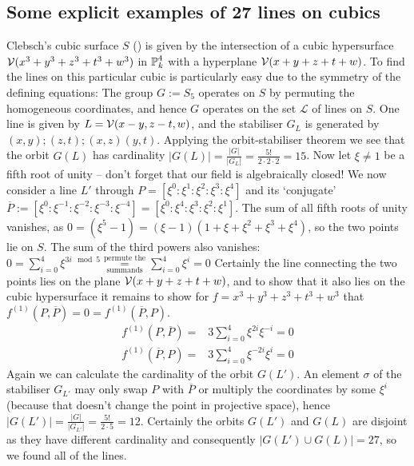 \subsection{Some explicit examples of 27 lines on cubics}


\begin{example}
Clebsch's cubic surface $S$ (\cite[§16,p.331 ff.]{clebsch1871ueber}) is given by the intersection of a cubic hypersurface $\operatorname{\mathcal V}(x^3 + y^3 + z^3 + t^3 + w^3)$ in $\operatorname{\mathbb P}^4_k$ with a hyperplane $\operatorname{\mathcal V}(x+y+z+t+w)$.
To find the lines on this particular cubic is particularly easy due to the symmetry of the defining equations: The group $G := S_5$ operates on $S$ by permuting the homogeneous coordinates, and hence $G$ operates on the set $\mathcal L$ of lines on $S$.
One line is given by $L = \operatorname{\mathcal V}(x-y,z-t,w)$, and the stabiliser $G_L$ is generated by $(x,y);(z,t);(x,z)(y,t)$.
Applying the orbit-stabiliser theorem we see that the orbit $G(L)$ has cardinality $|G(L)| = \frac{|G|}{|G_L|} = \frac{5!}{2\cdot2\cdot2} = 15$.
Now let $\xi \neq 1$ be a fifth root of unity -- don't forget that our field is algebraically closed!
We now consider a line $L'$ through $P = [\xi^0:\xi^1:\xi^2:\xi^3:\xi^4]$ and its `conjugate' $\overline{P} := [\xi^0:\xi^{-1}:\xi^{-2}:\xi^{-3}:\xi^{-4}] = [\xi^0:\xi^4:\xi^3:\xi^2:\xi^1]$.
The sum of all fifth roots of unity vanishes, as $0 = (\xi^5 - 1) = (\xi - 1)(1 + \xi + \xi^2+\xi^3+\xi^4)$, so the two points lie on $S$.
The sum of the third powers also vanishes: $0 = \sum_{i=0}^4 \xi^{3i \mod 5} \overset{\text{permute the}}{\underset{\text{summands}}=} \sum_{i=0}^4 \xi^i = 0$
Certainly the line connecting the two points lies on the plane $\operatorname{\mathcal V}(x+y+z+t+w)$, and to show that it also lies on the cubic hypersurface it remains to show for $f = x^3 + y^3 + z^3 + t^3 + w^3$ that $f^{(1)}(P,\overline P) = 0 = f^{(1)}(\overline P,P)$.
\begin{align}
f^{(1)}(P,\overline{P}) =& 3 \sum_{i=0}^4 \xi^{2i}\xi^{-i} = 0 \\
f^{(1)}(\overline{P},P) =& 3 \sum_{i=0}^4 \xi^{-2i}\xi^{i} = 0
\end{align}
Again we can calculate the cardinality of the orbit $G(L')$.
An element $\sigma$ of the stabiliser $G_{L'}$ may only swap $P$ with $\overline{P}$ or multiply the coordinates by some $\xi^i$ (because that doesn't change the point in projective space), hence $|G(L')| = \frac{|G|}{|G_{L'}|} = \frac{5!}{2\cdot 5} = 12$.
Certainly the orbits $G(L')$ and $G(L)$ are disjoint as they have different cardinality and consequently $|G(L') \cup G(L)| = 27$, so we found all of the lines.
\end{example}



